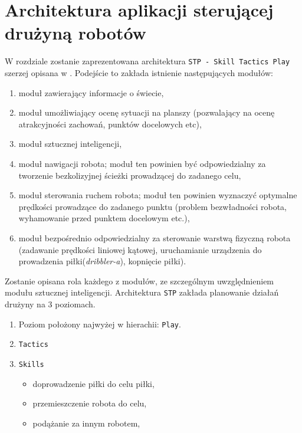 \chapter{Architektura aplikacji sterującej drużyną robotów}
W rozdziale zostanie zaprezentowana architektura \mbox{\texttt{STP - Skill Tactics Play}} szerzej opisana 
w \cite{stp}. Podejście to zakłada istnienie następujących modułów:
\begin{enumerate}
  \item moduł zawierający informacje o świecie,
  \item moduł umożliwiający ocenę sytuacji na planszy (pozwalający na ocenę atrakcyjności zachowań, punktów docelowych etc),
  \item moduł sztucznej inteligencji,
  \item moduł nawigacji robota; 
  moduł ten powinien być odpowiedzialny za tworzenie bezkolizyjnej ścieżki prowadzącej do zadanego celu,
  \item moduł sterowania ruchem robota;
  moduł ten powinien wyznaczyć optymalne prędkości prowadzące do zadanego punktu (problem bezwładności robota,
  wyhamowanie przed punktem docelowym etc.),
  \item moduł bezpośrednio odpowiedzialny za sterowanie warstwą fizyczną robota (zadawanie prędkości liniowej kątowej, uruchamianie urządzenia do prowadzenia 
  piłki(\textit{dribbler-a}), kopnięcie piłki).
\end{enumerate}

Zostanie opisana rola każdego z modułów, ze szczególnym uwzględnieniem modułu sztucznej inteligencji.
Architektura \texttt{STP} zakłada planowanie działań drużyny na 3 poziomach.
\begin{enumerate}
 \item Poziom położony najwyżej w hierachii: \texttt{Play}.
 \item \texttt{Tactics}
 \item \texttt{Skills} 
     \begin{itemize}
    \item doprowadzenie piłki do celu piłki,
    \item przemieszczenie robota do celu,
    \item podążanie za innym robotem,
    \end{itemize}
\end{enumerate}


